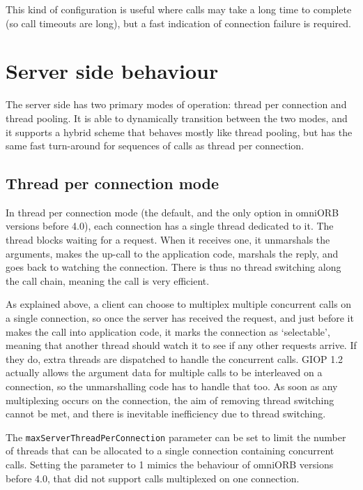 \documentclass[11pt,oneside,a4paper]{book}
\newcommand{\code}[1]{\texttt{#1}}
\begin{document}
This kind of configuration is useful where calls may take a long time
to complete (so call timeouts are long), but a fast indication of
connection failure is required.


\section{Server side behaviour}

The server side has two primary modes of operation: thread per
connection and thread pooling. It is able to dynamically transition
between the two modes, and it supports a hybrid scheme that behaves
mostly like thread pooling, but has the same fast turn-around for
sequences of calls as thread per connection.

\subsection{Thread per connection mode}

In thread per connection mode (the default, and the only option in
omniORB versions before 4.0), each connection has a single thread
dedicated to it. The thread blocks waiting for a request. When it
receives one, it unmarshals the arguments, makes the up-call to the
application code, marshals the reply, and goes back to watching the
connection. There is thus no thread switching along the call chain,
meaning the call is very efficient.

As explained above, a client can choose to multiplex multiple
concurrent calls on a single connection, so once the server has
received the request, and just before it makes the call into
application code, it marks the connection as `selectable', meaning
that another thread should watch it to see if any other requests
arrive. If they do, extra threads are dispatched to handle the
concurrent calls. GIOP 1.2 actually allows the argument data for
multiple calls to be interleaved on a connection, so the unmarshalling
code has to handle that too. As soon as any multiplexing occurs on the
connection, the aim of removing thread switching cannot be met, and
there is inevitable inefficiency due to thread switching.

The \code{maxServerThreadPerConnection} parameter can be set to limit
the number of threads that can be allocated to a single connection
containing concurrent calls. Setting the parameter to 1 mimics the
behaviour of omniORB versions before 4.0, that did not support
calls multiplexed on one connection.
\end{document}
